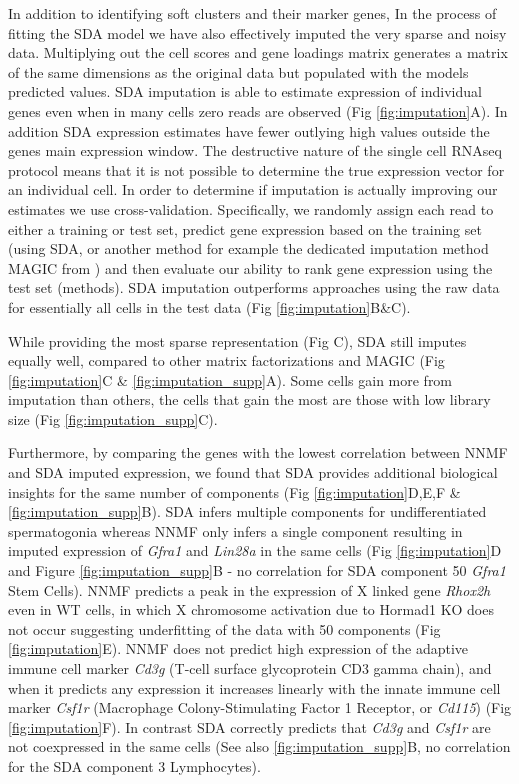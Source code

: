 In addition to identifying soft clusters and their marker genes, In the process of fitting the SDA model we have also effectively imputed the very sparse and noisy data. Multiplying out the cell scores and gene loadings matrix generates a matrix of the same dimensions as the original data but populated with the models predicted values. SDA imputation is able to estimate expression of individual genes even when in many cells zero reads are observed (Fig \ref{fig:imputation}A). In addition SDA expression estimates have fewer outlying high values outside the genes main expression window. The destructive nature of the single cell RNAseq protocol means that it is not possible to determine the true expression vector for an individual cell. In order to determine if imputation is actually improving our estimates we use cross-validation. Specifically, we randomly assign each read to either a training or test set, predict gene expression based on the training set (using SDA, or another method for example the dedicated imputation method MAGIC from \cite{vanDijk2018Recovering}) and then evaluate our ability to rank gene expression using the test set (methods). SDA imputation outperforms approaches using the raw data for essentially all cells in the test data (Fig \ref{fig:imputation}B\&C).

While providing the most sparse representation (Fig \label{fig:SDA}C), SDA still imputes equally well, compared to other matrix factorizations and MAGIC \parencite{vanDijk2018Recovering} (Fig \ref{fig:imputation}C \& \ref{fig:imputation_supp}A). Some cells gain more from imputation than others, the cells that gain the most are those with low library size (Fig \ref{fig:imputation_supp}C).

Furthermore, by comparing the genes with the lowest correlation between NNMF and SDA imputed expression, we found that SDA provides additional biological insights for the same number of components (Fig \ref{fig:imputation}D,E,F \& \ref{fig:imputation_supp}B). SDA infers multiple components for undifferentiated spermatogonia whereas NNMF only infers a single component resulting in imputed expression of \textit{Gfra1} and \textit{Lin28a} in the same cells (Fig \ref{fig:imputation}D and Figure \ref{fig:imputation_supp}B - no correlation for SDA component 50 \textit{Gfra1} Stem Cells). NNMF predicts a peak in the expression of X linked gene \textit{Rhox2h} even in WT cells, in which X chromosome activation due to Hormad1 KO does not occur suggesting underfitting of the data with 50 components (Fig \ref{fig:imputation}E). NNMF does not predict high expression of the adaptive immune cell marker \textit{Cd3g} (T-cell surface glycoprotein CD3 gamma chain), and when it predicts any expression it increases linearly with the innate immune cell marker \textit{Csf1r} (Macrophage Colony-Stimulating Factor 1 Receptor, or \textit{Cd115}) (Fig \ref{fig:imputation}F). In contrast SDA correctly predicts that \textit{Cd3g} and \textit{Csf1r} are not coexpressed in the same cells (See also \ref{fig:imputation_supp}B, no correlation for the SDA component 3 Lymphocytes).


